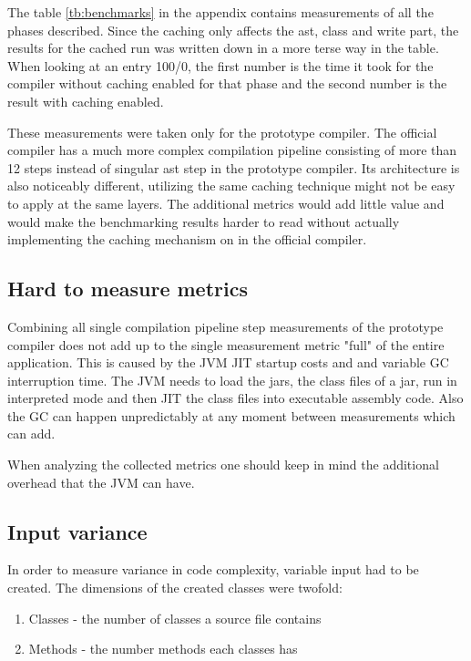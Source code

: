\documentclass{VUMIFPSbakalaurinis}
\begin{document}
The table \ref{tb:benchmarks} in the appendix contains measurements of all the phases described.
Since the caching only affects the ast, class and write part, the results for the cached run was written down in a more terse way in the table.
When looking at an entry 100/0, the first number is the time it took for the compiler without caching enabled for that phase and the second number is the result with caching enabled.

These measurements were taken only for the prototype compiler.
The official compiler has a much more complex compilation pipeline consisting of more than 12 steps instead of singular ast step in the prototype compiler.
Its architecture is also noticeably different, utilizing the same caching technique might not be easy to apply at the same layers.
The additional metrics would add little value and would make the benchmarking results harder to read without actually implementing the caching mechanism on in the official compiler.

\subsection{Hard to measure metrics}
Combining all single compilation pipeline step measurements of the prototype compiler does not add up to the single measurement metric "full" of the entire application.
This is caused by the JVM JIT startup costs and and variable GC interruption time.
The JVM needs to load the jars, the class files of a jar, run in interpreted mode and then JIT the class files into executable assembly code.
Also the GC can happen unpredictably at any moment between measurements which can add.

When analyzing the collected metrics one should keep in mind the additional overhead that the JVM can have.

\subsection{Input variance}
In order to measure variance in code complexity, variable input had to be created.
The dimensions of the created classes were twofold:

\begin{enumerate}
\item{Classes - the number of classes a source file contains}
\item{Methods - the number methods each classes has}
\end{enumerate}
\end{document}
